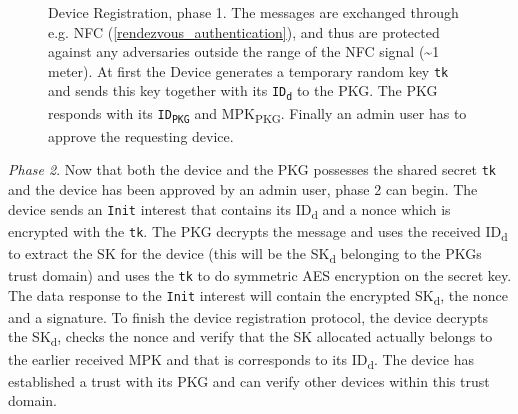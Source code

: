 \begin{figure}[ht]
  \centering
  \caption[Device Registration, phase 1]{Device Registration, phase 1.
  The messages are exchanged through e.g. NFC (\autoref{rendezvous_authentication}), and thus are protected against any adversaries outside the range of the NFC signal (\textasciitilde{1} meter).
  At first the Device generates a temporary random key \texttt{tk} and sends this key together with its \texttt{ID\textsubscript{d}} to the PKG. 
  The PKG responds with its \texttt{ID\textsubscript{PKG}} and \gls{MPK}\textsubscript{PKG}.
  Finally an admin user has to approve the requesting device. 
  }
  \label{fig:init_ibe_1}
\end{figure}

\textit{Phase 2}.
Now that both the device and the \gls{PKG} possesses the shared secret \texttt{tk} and the device has been approved by an admin user, phase 2 can begin.
The device sends an \texttt{Init} \gls{interest} that contains its ID\textsubscript{d} and a nonce which is encrypted with the \texttt{tk}.
The \gls{PKG} decrypts the message and uses the received ID\textsubscript{d} to extract the \gls{SK} for the device (this will be the \gls{SK}\textsubscript{d} belonging to the \gls{PKG}s trust domain) and uses the \texttt{tk} to do symmetric \gls{AES} encryption on the secret key. 
The \gls{data} response to the \texttt{Init} \gls{interest} will contain the encrypted \gls{SK}\textsubscript{d}, the nonce and a signature.
To finish the device registration protocol, the device decrypts the \gls{SK}\textsubscript{d}, checks the nonce and verify that the \gls{SK} allocated actually belongs to the earlier received \gls{MPK} and that is corresponds to its \gls{ID}\textsubscript{d}.
The device has established a trust with its \gls{PKG} and can verify other devices within this trust domain. 

